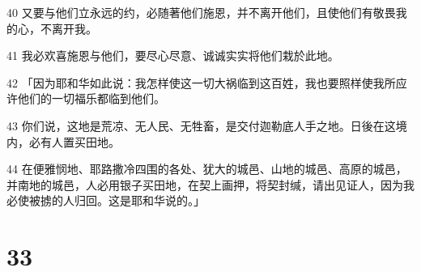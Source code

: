 \par 40 又要与他们立永远的约，必随著他们施恩，并不离开他们，且使他们有敬畏我的心，不离开我。
\par 41 我必欢喜施恩与他们，要尽心尽意、诚诚实实将他们栽於此地。
\par 42 「因为耶和华如此说：我怎样使这一切大祸临到这百姓，我也要照样使我所应许他们的一切福乐都临到他们。
\par 43 你们说，这地是荒凉、无人民、无牲畜，是交付迦勒底人手之地。日後在这境内，必有人置买田地。
\par 44 在便雅悯地、耶路撒冷四围的各处、犹大的城邑、山地的城邑、高原的城邑，并南地的城邑，人必用银子买田地，在契上画押，将契封缄，请出见证人，因为我必使被掳的人归回。这是耶和华说的。」

\chapter{33}

